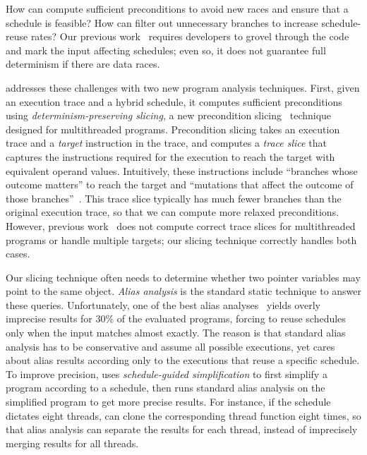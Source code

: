 How can \peregrine compute sufficient preconditions to avoid new races and
ensure that a schedule is feasible?  How can \peregrine filter out unnecessary
branches to increase schedule-reuse rates?  Our previous
work~\cite{cui:tern:osdi10} requires developers to grovel through the
code and mark the input affecting schedules; even so, it does not
guarantee full determinism if there are data races.

\peregrine addresses these challenges with two new
program analysis techniques.  First, given an execution trace and a hybrid
schedule, it computes sufficient preconditions using
\emph{determinism-preserving slicing}, a new precondition
slicing~\cite{castro:bouncer} technique designed for multithreaded
programs.  Precondition slicing takes an execution trace and a
\emph{target} instruction in the trace, and computes 
a \emph{trace slice} that captures the instructions required for the
execution to reach the target with equivalent operand
values.  Intuitively, these instructions include ``branches whose
  outcome matters'' to reach the target and ``mutations that affect the
  outcome of those branches''~\cite{castro:bouncer}.  This trace slice
typically has much fewer branches than the original execution trace,
so that we can compute more relaxed preconditions.  However, previous
work~\cite{castro:bouncer} does not compute correct trace slices for
multithreaded programs or handle multiple targets; our slicing
technique correctly handles both cases.

Our slicing technique often needs to determine whether two pointer
variables may point to the same object.  \emph{Alias
  analysis} is the standard static technique to answer these queries.
Unfortunately, one of the best alias analyses~\cite{bddalias:pldi04} yields
overly
imprecise results for 30\% of the evaluated programs, forcing \peregrine to
reuse
schedules only when the input matches almost exactly.  The reason is that
standard
alias analysis has to be conservative and assume all possible executions,
yet \peregrine cares about alias results
according only to the executions that reuse a specific schedule.  To
improve precision, \peregrine uses \emph{schedule-guided simplification} to
first simplify a program according to a schedule, then runs standard alias
analysis on the simplified program to get more precise results.  For
instance, if the schedule dictates eight threads, \peregrine can clone
the corresponding thread function eight times, so that alias analysis can
separate the results for each thread, instead of imprecisely merging
results for all threads.

